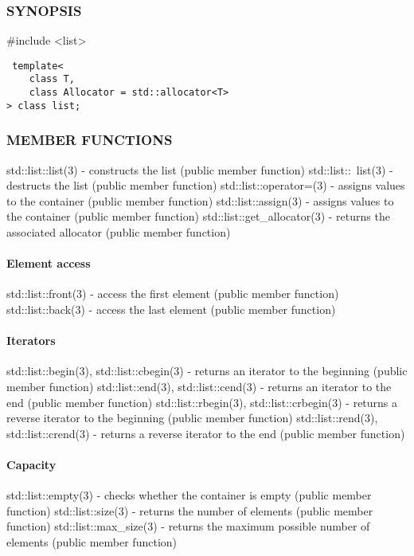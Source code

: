\subsubsection{SYNOPSIS}
\#include <list>

\begin{lstlisting}
 template<
    class T,
    class Allocator = std::allocator<T>
> class list;
\end{lstlisting}

\subsubsection{MEMBER FUNCTIONS}
std::list::list(3) - constructs the list  (public member function)
std::list::~list(3) - destructs the list  (public member function)
std::list::operator=(3) - assigns values to the container   (public member function)
std::list::assign(3) - assigns values to the container   (public member function)
std::list::get\_allocator(3) - returns the associated allocator   (public member function)
\paragraph{Element access}
std::list::front(3) - access the first element   (public member function)
std::list::back(3) - access the last element   (public member function)
\paragraph{Iterators}
std::list::begin(3), std::list::cbegin(3) - returns an iterator to the beginning   (public member function)
std::list::end(3), std::list::cend(3) - returns an iterator to the end   (public member function)
std::list::rbegin(3), std::list::crbegin(3) - returns a reverse iterator to the beginning   (public member function)
std::list::rend(3), std::list::crend(3) - returns a reverse iterator to the end   (public member function)
\paragraph{Capacity}
std::list::empty(3) - checks whether the container is empty   (public member function)
std::list::size(3) - returns the number of elements   (public member function)
std::list::max\_size(3) - returns the maximum possible number of elements   (public member function)
